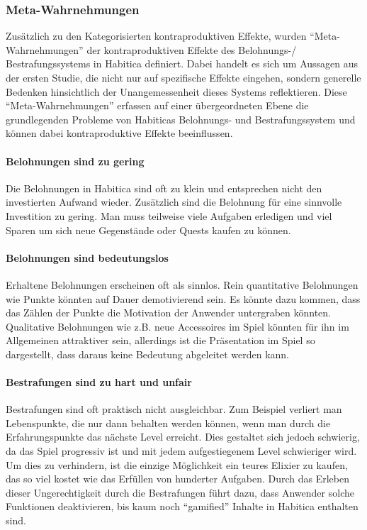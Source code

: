 \documentclass[sigconf, nonacm]{acmart}
\begin{document}
\subsubsection{Meta-Wahrnehmungen}
Zusätzlich zu den Kategorisierten kontraproduktiven Effekte, wurden \enquote{Meta-Wahrnehmungen} der kontraproduktiven Effekte des Belohnungs-/ Bestrafungssystems in Habitica definiert. Dabei handelt es sich um Aussagen aus der ersten Studie, die nicht nur auf spezifische Effekte eingehen, sondern generelle Bedenken hinsichtlich der Unangemessenheit dieses Systems reflektieren. Diese \enquote{Meta-Wahrnehmungen} erfassen auf einer übergeordneten Ebene die grundlegenden Probleme von Habiticas Belohnungs- und Bestrafungssystem und können dabei kontraproduktive Effekte beeinflussen.

\paragraph{Belohnungen sind zu gering}\label{sec:acpe1}
Die Belohnungen in Habitica sind oft zu klein und entsprechen nicht den investierten Aufwand wieder. Zusätzlich sind die Belohnung für eine sinnvolle Investition zu gering. Man muss teilweise viele Aufgaben erledigen und viel Sparen um sich neue Gegenstände oder Quests kaufen zu können.

\paragraph{Belohnungen sind bedeutungslos}\label{sec:acpe2}
Erhaltene Belohnungen erscheinen oft als sinnlos. Rein quantitative Belohnungen wie Punkte könnten auf Dauer demotivierend sein. Es könnte dazu kommen, dass das Zählen der Punkte die Motivation der Anwender untergraben könnten. Qualitative Belohnungen wie z.B. neue Accessoires im Spiel könnten für ihn im Allgemeinen attraktiver sein, allerdings ist die Präsentation im Spiel so dargestellt, dass daraus keine Bedeutung abgeleitet werden kann.

\paragraph{Bestrafungen sind zu hart und unfair}\label{sec:acpe3}
Bestrafungen sind oft praktisch nicht ausgleichbar. Zum Beispiel verliert man Lebenspunkte, die nur dann behalten werden können, wenn man durch die Erfahrungspunkte das nächste Level erreicht. Dies gestaltet sich jedoch schwierig, da das Spiel progressiv ist und mit jedem aufgestiegenem Level schwieriger wird. Um dies zu verhindern, ist die einzige Möglichkeit ein teures Elixier zu kaufen, das so viel kostet wie das Erfüllen von hunderter Aufgaben. Durch das Erleben dieser Ungerechtigkeit durch die Bestrafungen führt dazu, dass Anwender solche Funktionen deaktivieren, bis kaum noch \enquote{gamified} Inhalte in Habitica enthalten sind.
\end{document}
